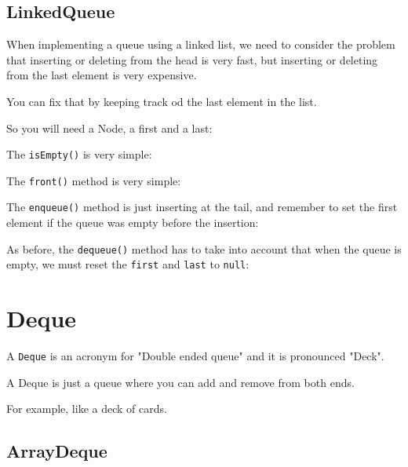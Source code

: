 \documentclass[a4paper, 9pt]{extarticle}
\begin{document}
\subsection{LinkedQueue}

When implementing a queue using a linked list, we need to consider the problem
that inserting or deleting from the head is very fast, but inserting or
deleting from the last element is very expensive.

You can fix that by keeping track od the last element in the list.

So you will need a Node, a first and a last:


The \verb+isEmpty()+ is very simple:


The \verb+front()+ method is very simple:


The \verb+enqueue()+ method is just inserting at the tail, and remember to set
the first element if the queue was empty before the insertion:


As before, the \verb+dequeue()+ method has to take into account that when the
queue is empty, we must reset the \verb+first+ and \verb+last+ to \verb+null+:










\section{Deque}

A \verb+Deque+ is an acronym for "Double ended queue" and it is pronounced
"Deck".

A Deque is just a queue where you can add and remove from both ends.

For example, like a deck of cards.




\subsection{ArrayDeque}
\end{document}
